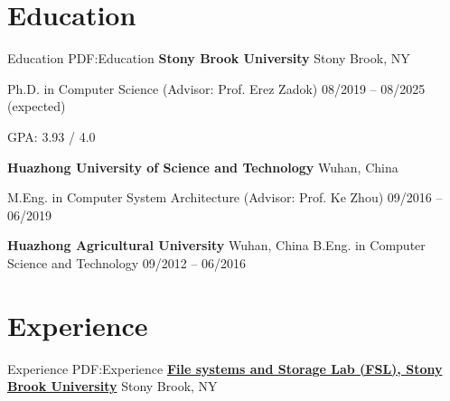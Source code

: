 \documentclass[a4paper,10pt,oneside]{article}
\begin{document}
\begin{body}


\section
{Education}
{Education}
{PDF:Education}
{\textbf{Stony Brook University}}
\hfill
Stony Brook, NY

\BulletItem
Ph.D. in
{Computer Science} (Advisor: Prof. Erez Zadok)
\hfill
08/2019 -- 08/2025 (expected)


\begin{detail}
\BulletItem
GPA: 3.93 / 4.0 

\end{detail}

\GapNoBreak

{\textbf{Huazhong University of Science and Technology}}
\hfill
Wuhan, China

\GapNoBreak
\BulletItem
M.Eng. in
{Computer System Architecture} (Advisor: Prof. Ke Zhou)
\hfill
09/2016 -- 06/2019
\begin{detail}
\end{detail}

\GapNoBreak

{\textbf{Huazhong Agricultural University}}
\hfill
Wuhan, China
\GapNoBreak
\BulletItem
B.Eng. in
{Computer Science and Technology}
\hfill
09/2012 -- 06/2016
\begin{detail}
\end{detail}


\section
{Experience}
{Experience}
{PDF:Experience}
\href{https://www.fsl.cs.stonybrook.edu/}
{{\textbf{File systems and Storage Lab (FSL), Stony Brook University}}}
\hfill
Stony Brook, NY


\end{body}
\end{document}
